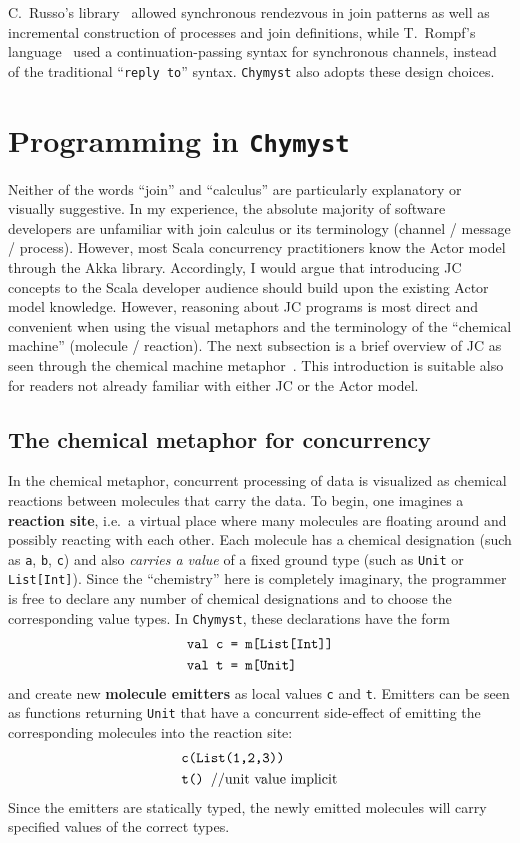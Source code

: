\documentclass[sigplan,10pt]{acmart}\settopmatter{}
\begin{document}
C.~Russo's library~\citep{Rus2007} allowed synchronous rendezvous
in join patterns as well as incremental construction of processes
and join definitions, while T.~Rompf's language~\citep{Rom2007}
used a continuation-passing syntax for synchronous channels, instead
of the traditional ``\texttt{reply to}'' syntax. \texttt{Chymyst}
also adopts these design choices.

\section{Programming in \texttt{Chymyst}}

Neither of the words ``join'' and ``calculus'' are particularly
explanatory or visually suggestive. In my experience, the absolute
majority of software developers are unfamiliar with join calculus
or its terminology (channel / message / process). However, most
Scala concurrency practitioners know the Actor model through
the Akka library. Accordingly, I would argue that introducing JC concepts
to the Scala developer audience should build upon the existing Actor
model knowledge. However, reasoning about JC programs is most direct
and convenient when using the visual metaphors and the terminology
of the ``chemical machine'' (molecule / reaction). The next subsection
is a brief overview of JC as seen through the chemical machine metaphor~\citep{FouGon1996}. This introduction is suitable also
for readers not already familiar with either JC or the Actor model.

\subsection{The chemical metaphor for concurrency}

In the chemical metaphor, concurrent processing of data is visualized as
chemical reactions between molecules that carry the data.
To begin, one imagines a \textbf{reaction site}, i.e.~a virtual place
where many molecules are floating around and possibly reacting with
each other. Each molecule has a chemical designation (such as \texttt{a},
\texttt{b}, \texttt{c}) and also \emph{carries a value} of a fixed
ground type (such as \texttt{Unit} or \texttt{List{[}Int{]}}). Since
the ``chemistry'' here is completely imaginary, the programmer is
free to declare any number of chemical designations and to choose
the corresponding value types. In \texttt{Chymyst}, these declarations
have the form
\begin{align*}
\text{\texttt{val c }} & \text{\texttt{= m[List[Int]]}}\\
\text{\texttt{val t }} & \text{\texttt{= m[Unit]}}
\end{align*}
and create new \textbf{molecule emitters} as local values
\texttt{c} and \texttt{t}. Emitters can be seen as functions returning \texttt{Unit}
that
have a concurrent side-effect of emitting the corresponding molecules into the reaction
site:
\begin{align*}
 & \text{\texttt{c(List(1,2,3))}}\\
 & \text{\texttt{t() }//unit value implicit}
\end{align*}
Since the emitters are statically typed, the newly emitted molecules will carry specified values of the
correct types.
\end{document}
